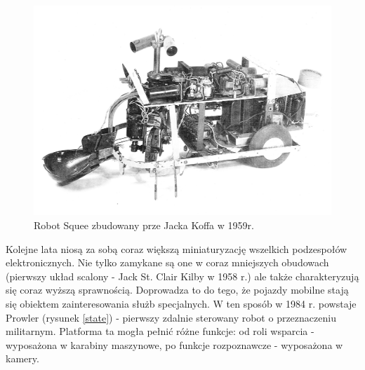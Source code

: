   \begin{figure}[H]
    \begin{center}
      \includegraphics[scale=0.35]{imgs/Squee.jpg}
 \caption[Robot \textit{Squee}]{\small{Robot Squee zbudowany prze Jacka Koffa w 1959r.}\footnotemark}
        \label{squee}
    \end{center}
  \end{figure}

Kolejne lata niosą za sobą coraz większą miniaturyzację wszelkich podzespołów elektronicznych. Nie tylko zamykane są one w coraz mniejszych obudowach (pierwszy układ scalony - Jack St. Clair Kilby w 1958 r.) ale także charakteryzują się coraz wyższą sprawnością. Doprowadza to do tego, że pojazdy mobilne stają się obiektem zainteresowania służb specjalnych. W ten sposób w 1984 r. powstaje Prowler (rysunek \ref{state}) - pierwszy zdalnie sterowany robot o przeznaczeniu militarnym. Platforma ta mogła pełnić różne funkcje: od roli wsparcia - wyposażona w karabiny maszynowe, po funkcje rozpoznawcze - wyposażona w kamery.

